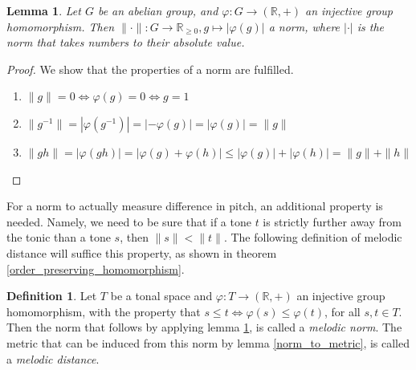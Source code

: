 \documentclass[a4paper]{book}
\newtheorem{lemma}[theorem]{Lemma}
\theoremstyle{definition}
\newtheorem{definition}[theorem]{Definition}
\begin{document}
\begin{lemma}
    Let $G$ be an abelian group, and $\varphi : G \to (\mathbb{R},+)$ an injective group homomorphism.
    Then $\| \cdot \| : G \to \mathbb{R}_{\geq 0}, g \mapsto |\varphi(g)|$ a norm, where $| \cdot |$ is the norm that takes numbers to their absolute value.
    \label{homomorphism_to_metric}
\end{lemma}
\begin{proof}
    We show that the properties of a norm are fulfilled.
    \begin{enumerate}[i]
        \item $\|g\| = 0 \Leftrightarrow \varphi(g) = 0 \Leftrightarrow g = 1$
        \item $\|g^{-1}\| = |\varphi(g^{-1})| = |-\varphi(g)| = |\varphi(g)| = \|g\|$
        \item $\|gh\| = |\varphi(gh)| = |\varphi(g) + \varphi(h)| \leq |\varphi(g)| + |\varphi(h)| = \|g\| + \|h\|$
    \end{enumerate}
\end{proof}

For a norm to actually measure difference in pitch, an additional property is needed.
Namely, we need to be sure that if a tone $t$ is strictly further away from the tonic than a tone $s$, then $\|s\| < \|t\|$.
The following definition of melodic distance will suffice this property, as shown in theorem \ref{order_preserving_homomorphism}.

\begin{definition}
    Let $T$ be a tonal space and $\varphi : T \to (\mathbb{R},+)$ an injective group homomorphism,
    with the property that $s \leq t \Leftrightarrow \varphi(s) \leq \varphi(t)$, for all $s,t \in T$.
    Then the norm that follows by applying lemma \ref{homomorphism_to_metric}, is called a \emph{melodic norm}.
    The metric that can be induced from this norm by lemma \ref{norm_to_metric}, is called a \emph{melodic distance}.
\end{definition}
\end{document}
